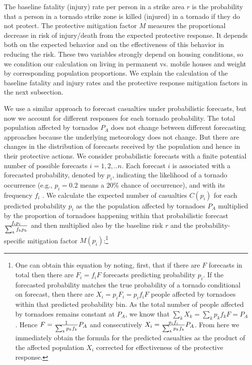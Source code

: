 \documentclass{ametsocV6.1}
\begin{document}
The baseline fatality (injury) rate per person in a strike area $r$ is the probability that a person in a tornado strike zone is killed (injured) in a tornado if they do not protect. The protective mitigation factor $M$ measures the proportional decrease in risk of injury/death from the expected protective response. It depends both on the expected behavior and on the effectiveness of this behavior in reducing the risk. These two variables strongly depend on housing conditions, so we condition our calculation on living in permanent vs. mobile houses and weight by corresponding population proportions. We explain the calculation of the baseline fatality and injury rates and the protective response mitigation factors in the next subsection.

We use a similar approach to forecast casualties under probabilistic forecasts, but now we account for different responses for each tornado probability.  The total population affected by tornados $P_A$ does not change between different forecasting approaches because the underlying meteorology does not change. But there are changes in the distribution of forecasts received by the population and hence in their protective actions. We consider probabilistic forecasts with a finite potential number of possible forecasts $i=1,2,..n$. Each forecast $i$ is associated with a forecasted probability, denoted by $p_i$, indicating the likelihood of a tornado occurrence (e.g., $p_i=0.2$ means a 20\% chance of occurrence), and with its frequency $f_i$ . We calculate the expected number of casualties $C(p_i)$ for each predicted probability $p_i$ as the the population affected by tornadoes $P_A$ multiplied by the proportion of tornadoes happening within that probabilistic forecast ${f_ip_i\over \sum_k f_k p_k}$ and then multiplied also by the baseline risk $r$ and the probability-specific mitigation factor $M(p_i)$:\footnote{One can obtain this equation by noting, first, that if there are $F$ forecasts in total then there are $F_i=f_i F$ forecasts predicting probability $p_i$. If the forecasted probability matches the true probability of a tornado conditional on forecast, then there are $X_i=p_i F_i=p_i f_i F$ people affected by tornadoes within that predicted probability bin. As the total number of people affected by tornadoes remains constant at $P_A$, we know that $\sum_kX_k=\sum_kp_kf_kF=P_A$. Hence $F={1\over \sum_k p_kf_k}P_A$ and consecutively $X_i={p_if_i\over \sum_k p_kf_k}P_A$. From here we immediately obtain the formula for the predicted casualties as the product of the affected population $X_i$ corrected for effectiveness of the protective response.}
\end{document}
